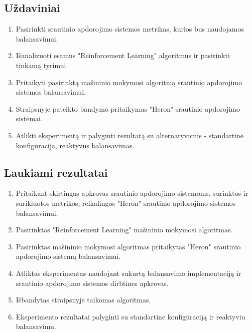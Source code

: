 \documentclass{VUMIFPSbakalaurinis}
\begin{document}
\subsection{Uždaviniai}
\begin{enumerate}
    \item Pasirinkti srautinio apdorojimo sistemos metrikas, kurios bus naudojamos balansavimui.
    \item Išanalizuoti esamus "Reinforcement Learning" algoritmus ir pasirinkti tinkamą tyrimui.
    \item Pritaikyti pasirinktą mašininio mokymosi algoritmą srautinio apdorojimo sistemos balansavimui.
    \item Straipsnyje \cite{vaquero2018autotuning} pateikto bandymo pritaikymas "Heron" srautinio apdorojimo sistemai.
    \item Atlikti eksperimentą ir palyginti rezultatą su alternatyvomis - standartinė konfigūracija, reaktyvus balansavimas. 
\end{enumerate}

\subsection{Laukiami rezultatai}
\begin{enumerate}
    \item Pritaikant skirtingas apkrovas srautinio apdorojimo sistemoms, surinktos ir surikiuotos metrikos, reikalingos "Heron" srautinio apdorojimo sistemos balansavimui. 
    \item Pasirinktas "Reinforcement Learning" mašininio mokymosi algoritmas.
    \item Pasirinktas mašininio mokymosi algoritmas pritaikytas "Heron" srautinio apdorojimo sistemų balansavimui.  
    \item Atliktas eksperimentas naudojant sukurtą balansavimo implementaciją ir srautinio apdorojimo sistemos dirbtines apkrovas.
    \item Išbandytas \cite{vaquero2018autotuning} straipsnyje taikomas algoritmas.
    \item Eksperimento rezultatai palyginti su standartine konfigūraciją ir reaktyviu balansavimu.
\end{enumerate}
 
\printbibliography[heading=bibintoc] 
\end{document}
